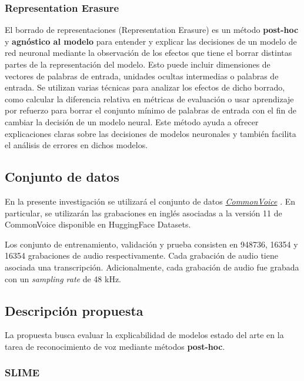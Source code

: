 \documentclass[conference]{IEEEtran}
\begin{document}
\subsubsection{Representation Erasure}
El borrado de representaciones \cite{li2017understanding} (Representation Erasure) es un método \textbf{post-hoc} y \textbf{agnóstico al modelo} para entender y explicar las decisiones de un modelo de red neuronal mediante la observación de los efectos que tiene el borrar distintas partes de la representación del modelo. Esto puede incluir dimensiones de vectores de palabras de entrada, unidades ocultas intermedias o palabras de entrada. Se utilizan varias técnicas para analizar los efectos de dicho borrado, como calcular la diferencia relativa en métricas de evaluación o usar aprendizaje por refuerzo para borrar el conjunto mínimo de palabras de entrada con el fin de cambiar la decisión de un modelo neural. Este método ayuda a ofrecer explicaciones claras sobre las decisiones de modelos neuronales y también facilita el análisis de errores en dichos modelos.

\subsection{Conjunto de datos}

En la presente investigación se utilizará el conjunto de datos \href{https://commonvoice.mozilla.org/en/datasets}{\textit{CommonVoice}} \cite{commonvoice:2020}. En particular, se utilizarán las grabaciones en inglés asociadas a la versión 11 de CommonVoice disponible en HuggingFace Datasets.

Los conjunto de entrenamiento, validación y prueba consisten en 948736, 16354 y 16354 grabaciones de audio respectivamente. Cada grabación de audio tiene asociada una transcripción. Adicionalmente, cada grabación de audio fue grabada con un \textit{sampling rate} de 48 kHz.

\subsection{Descripción propuesta}

La propuesta busca evaluar la explicabilidad de modelos estado del arte en la tarea de reconocimiento de voz mediante métodos \textbf{post-hoc}.

\subsubsection{SLIME}
\end{document}
